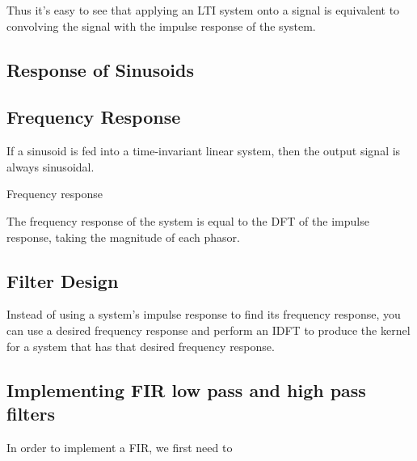 \begin{center}\end{center}

Thus it's easy to see that applying an LTI system onto a signal is equivalent to 
convolving the signal with the impulse response of the system.

\subsection{Response of Sinusoids}


\subsection{Frequency Response}
If a sinusoid is fed into a time-invariant linear system, then the output signal is always sinusoidal.

Frequency response

The frequency response of the system is equal to the DFT of the impulse response,
taking the magnitude of each phasor.

\subsection{Filter Design}
Instead of using a system's impulse response to find its frequency response, 
you can use a desired frequency response and perform an IDFT to produce the 
kernel for a system that has that desired frequency response.



\subsection{Implementing FIR low pass and high pass filters}
In order to implement a FIR, we first need to

